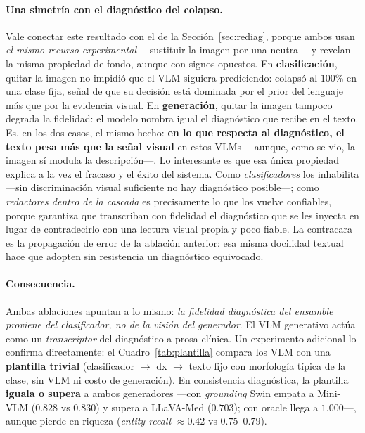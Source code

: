 \documentclass[11pt, a4paper]{article}
\begin{document}
\paragraph{Una simetría con el diagnóstico del colapso.} Vale conectar este resultado con el de la
Sección~\ref{sec:rediag}, porque ambos usan \emph{el mismo recurso experimental} —sustituir la imagen por
una neutra— y revelan la misma propiedad de fondo, aunque con signos opuestos. En \textbf{clasificación},
quitar la imagen no impidió que el VLM siguiera prediciendo: colapsó al $100\%$ en una clase fija, señal de
que su decisión está dominada por el prior del lenguaje más que por la evidencia visual. En
\textbf{generación}, quitar la imagen tampoco degrada la fidelidad: el modelo nombra igual el diagnóstico
que recibe en el texto. Es, en los dos casos, el mismo hecho: \textbf{en lo que respecta al diagnóstico,
el texto pesa más que la señal visual} en estos VLMs —aunque, como se vio, la imagen sí modula la
descripción—. Lo interesante es que esa única propiedad explica a la vez el fracaso y el éxito del sistema.
Como \emph{clasificadores} los inhabilita —sin discriminación visual suficiente no hay diagnóstico posible—;
como \emph{redactores dentro de la cascada} es precisamente lo que los vuelve confiables, porque garantiza
que transcriban con fidelidad el diagnóstico que se les inyecta en lugar de contradecirlo con una lectura
visual propia y poco fiable. La contracara es la propagación de error de la ablación anterior: esa misma
docilidad textual hace que adopten sin resistencia un diagnóstico equivocado.

\paragraph{Consecuencia.} Ambas ablaciones apuntan a lo mismo: \emph{la fidelidad diagnóstica del
ensamble proviene del clasificador, no de la visión del generador}. El VLM generativo actúa como un
\emph{transcriptor} del diagnóstico a prosa clínica. Un experimento adicional lo confirma directamente: el
Cuadro~\ref{tab:plantilla} compara los VLM con una \textbf{plantilla trivial} (clasificador
$\rightarrow$ dx $\rightarrow$ texto fijo con morfología típica de la clase, sin VLM ni costo de
generación). En consistencia diagnóstica, la plantilla \textbf{iguala o supera} a ambos generadores —con
\emph{grounding} Swin empata a Mini-VLM ($0.828$ vs $0.830$) y supera a LLaVA-Med ($0.703$); con oracle
llega a $1.000$—, aunque pierde en riqueza (\emph{entity recall} $\approx 0.42$ vs $0.75$--$0.79$).
\end{document}
